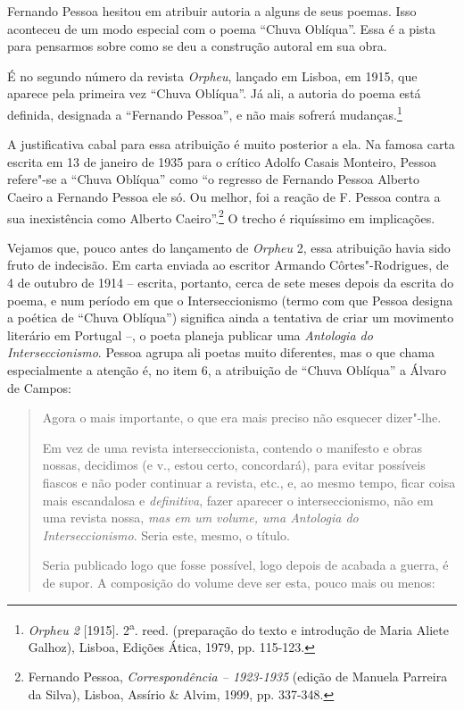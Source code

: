 Fernando Pessoa hesitou em atribuir autoria a alguns de seus poemas.
Isso aconteceu de um modo especial com o poema ``Chuva Oblíqua''. Essa é
a pista para pensarmos sobre como se deu a construção autoral em sua
obra.

É no segundo número da revista \emph{Orpheu}, lançado em Lisboa, em
1915, que aparece pela primeira vez ``Chuva Oblíqua''. Já ali, a autoria
do poema está definida, designada a ``Fernando Pessoa'', e não mais
sofrerá mudanças.\footnote{\emph{Orpheu 2} {[}1915{]}.
  2\textsuperscript{a}. reed. (preparação do texto e introdução de Maria
  Aliete Galhoz), Lisboa, Edições Ática, 1979, pp. 115-123.}

A justificativa cabal para essa atribuição é muito posterior a ela. Na
famosa carta escrita em 13 de janeiro de 1935 para o crítico Adolfo
Casais Monteiro, Pessoa refere"-se a ``Chuva Oblíqua'' como ``o regresso
de Fernando Pessoa Alberto Caeiro a Fernando Pessoa ele só. Ou melhor,
foi a reação de F. Pessoa contra a sua inexistência como Alberto
Caeiro''.\footnote{Fernando Pessoa, \emph{Correspondência -- 1923-1935}
  (edição de Manuela Parreira da Silva), Lisboa, Assírio \& Alvim, 1999,
  pp. 337-348.} O trecho é riquíssimo em implicações.

Vejamos que, pouco antes do lançamento de \emph{Orpheu} 2, essa
atribuição havia sido fruto de indecisão\emph{.} Em carta enviada ao
escritor Armando Côrtes"-Rodrigues, de 4 de outubro de 1914 -- escrita,
portanto, cerca de sete meses depois da escrita do poema, e num período
em que o Interseccionismo (termo com que Pessoa designa a poética de
``Chuva Oblíqua'') significa ainda a tentativa de criar um movimento
literário em Portugal --, o poeta planeja publicar uma \emph{Antologia
do Interseccionismo}. Pessoa agrupa ali poetas muito diferentes, mas o
que chama especialmente a atenção é, no item 6, a atribuição de ``Chuva
Oblíqua'' a Álvaro de Campos:

\begin{quote}
Agora o mais importante, o que era mais preciso não esquecer dizer"-lhe.

Em vez de uma revista interseccionista, contendo o manifesto e obras
nossas, decidimos (e v., estou certo, concordará), para evitar possíveis
fiascos e não poder continuar a revista, etc., e, ao mesmo tempo, ficar
coisa mais escandalosa e \emph{definitiva}, fazer aparecer o
interseccionismo, não em uma revista nossa, \emph{mas em um volume, uma
Antologia do Interseccionismo}. Seria este, mesmo, o título.

Seria publicado logo que fosse possível, logo depois de acabada a
guerra, é de supor. A composição do volume deve ser esta, pouco mais ou
menos:
\end{quote}

